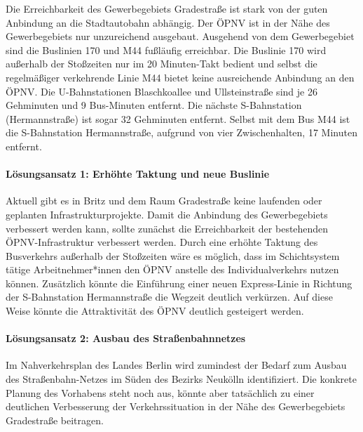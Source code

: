 
Die Erreichbarkeit des Gewerbegebiets Gradestraße ist stark von der guten Anbindung an die Stadtautobahn abhängig. Der ÖPNV ist in der Nähe des Gewerbegebiets nur unzureichend ausgebaut. Ausgehend von dem Gewerbegebiet sind die Buslinien 170 und M44 fußläufig erreichbar. Die Buslinie 170 wird außerhalb der Stoßzeiten nur im 20 Minuten-Takt bedient und selbst die regelmäßiger verkehrende Linie M44 bietet keine ausreichende Anbindung an den ÖPNV. Die U-Bahnstationen Blaschkoallee und Ullsteinstraße sind je 26 Gehminuten und 9 Bus-Minuten entfernt. Die nächste S-Bahnstation (Hermannstraße) ist sogar 32 Gehminuten entfernt. Selbst mit dem Bus M44 ist die S-Bahnstation Hermannstraße, aufgrund von vier Zwischenhalten, 17 Minuten entfernt.

\paragraph{Lösungsansatz 1: Erhöhte Taktung und neue Buslinie}
Aktuell gibt es in Britz und dem Raum Gradestraße keine laufenden oder geplanten Infrastrukturprojekte. Damit die Anbindung des Gewerbegebiets verbessert werden kann, sollte zunächst die Erreichbarkeit der bestehenden ÖPNV-Infrastruktur verbessert werden. Durch eine erhöhte Taktung des Busverkehrs außerhalb der Stoßzeiten wäre es möglich, dass im Schichtsystem tätige Arbeitnehmer*innen den ÖPNV anstelle des Individualverkehrs nutzen können. Zusätzlich könnte die Einführung einer neuen Express-Linie in Richtung der S-Bahnstation Hermannstraße die Wegzeit deutlich verkürzen. Auf diese Weise könnte die Attraktivität des ÖPNV deutlich gesteigert werden.

\paragraph{Lösungsansatz 2: Ausbau des Straßenbahnnetzes}
Im Nahverkehrsplan des Landes Berlin wird zumindest der Bedarf zum Ausbau des Straßenbahn-Netzes im Süden des Bezirks Neukölln identifiziert. Die konkrete Planung des Vorhabens steht noch aus, könnte aber tatsächlich zu einer deutlichen Verbesserung der Verkehrssituation in der Nähe des Gewerbegebiets Gradestraße beitragen. 
